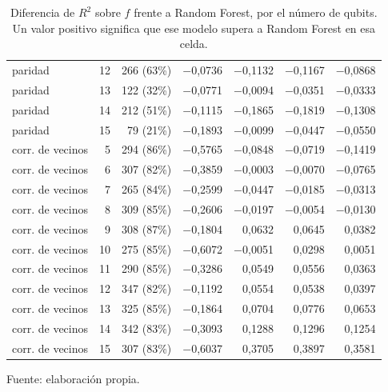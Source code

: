 \begin{table}[htbp]
{\begin{tabular}{@{}lrrrrrr@{}}
        paridad & 12 & 266 (63\%) & $-$0,0736 & $-$0,1132 & $-$0,1167 & $-$0,0868 \\
        paridad & 13 & 122 (32\%) & $-$0,0771 & $-$0,0094 & $-$0,0351 & $-$0,0333 \\
        paridad & 14 & 212 (51\%) & $-$0,1115 & $-$0,1865 & $-$0,1819 & $-$0,1308 \\
        paridad & 15 & 79 (21\%) & $-$0,1893 & $-$0,0099 & $-$0,0447 & $-$0,0550 \\
        corr. de vecinos & 5 & 294 (86\%) & $-$0,5765 & $-$0,0848 & $-$0,0719 & $-$0,1419 \\
        corr. de vecinos & 6 & 307 (82\%) & $-$0,3859 & $-$0,0003 & $-$0,0070 & $-$0,0765 \\
        corr. de vecinos & 7 & 265 (84\%) & $-$0,2599 & $-$0,0447 & $-$0,0185 & $-$0,0313 \\
        corr. de vecinos & 8 & 309 (85\%) & $-$0,2606 & $-$0,0197 & $-$0,0054 & $-$0,0130 \\
        corr. de vecinos & 9 & 308 (87\%) & $-$0,1804 & 0,0632 & 0,0645 & 0,0382 \\
        corr. de vecinos & 10 & 275 (85\%) & $-$0,6072 & $-$0,0051 & 0,0298 & 0,0051 \\
        corr. de vecinos & 11 & 290 (85\%) & $-$0,3286 & 0,0549 & 0,0556 & 0,0363 \\
        corr. de vecinos & 12 & 347 (82\%) & $-$0,1192 & 0,0554 & 0,0538 & 0,0397 \\
        corr. de vecinos & 13 & 325 (85\%) & $-$0,1864 & 0,0704 & 0,0776 & 0,0653 \\
        corr. de vecinos & 14 & 342 (83\%) & $-$0,3093 & 0,1288 & 0,1296 & 0,1254 \\
        corr. de vecinos & 15 & 307 (83\%) & $-$0,6037 & 0,3705 & 0,3897 & 0,3581 \\
        \bottomrule
    \end{tabular}}

    \caption{Diferencia de $R^2$ sobre $f$ frente a Random Forest, por el número de qubits. Un valor positivo significa que ese modelo supera a Random Forest en esa celda.}
    \label{tab:v3_tamano_r2_dif}

    {\footnotesize Fuente: elaboración propia.}
\end{table}
